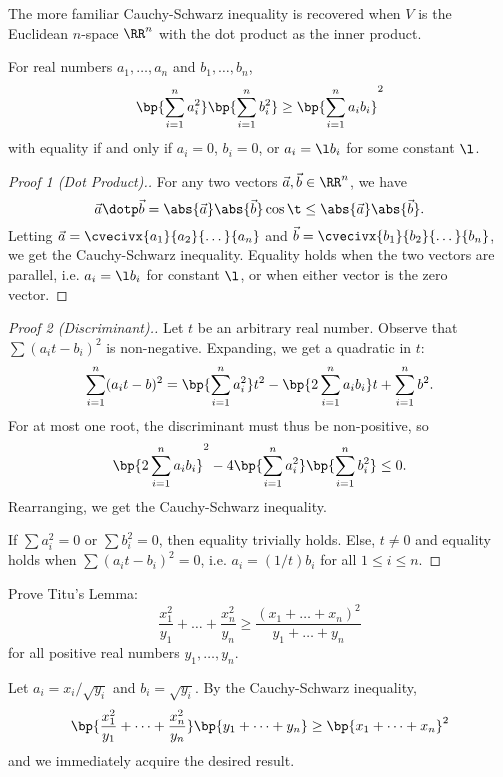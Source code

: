 The more familiar Cauchy-Schwarz inequality is recovered when $V$ is the Euclidean $n$-space $\RR^n$ with the dot product as the inner product.

\begin{proposition}
    For real numbers $a_1, \dots, a_n$ and $b_1, \dots, b_n$, \[\bp{\sum_{i = 1}^n a_i^2} \bp{\sum_{i = 1}^n b_i^2} \geq \bp{\sum_{i =1}^n a_i b_i}^2\] with equality if and only if $a_i = 0$, $b_i = 0$, or $a_i = \l b_i$ for some constant $\l$.
\end{proposition}
\begin{proof}[Proof 1 (Dot Product).]
    For any two vectors $\vec a, \vec b \in \RR^n$, we have \[\vec a \dotp \vec b = \abs{\vec a} \abs{\vec b} \cos \t \leq \abs{\vec a} \abs{\vec b}.\] Letting $\vec a = \cvecivx{a_1}{a_2}{\dots}{a_n}$ and $\vec b = \cvecivx{b_1}{b_2}{\dots}{b_n}$, we get the Cauchy-Schwarz inequality. Equality holds when the two vectors are parallel, i.e. $a_i = \l b_i$ for constant $\l$, or when either vector is the zero vector.
\end{proof}
\begin{proof}[Proof 2 (Discriminant).]
    Let $t$ be an arbitrary real number. Observe that $\sum (a_i t - b_i)^2$ is non-negative. Expanding, we get a quadratic in $t$: \[\sum_{i = 1}^n (a_i t - b)^2 = \bp{\sum_{i = 1}^n a_i^2} t^2 - \bp{2\sum_{i = 1}^n a_i b_i} t + \sum_{i = 1}^n b^2.\] For at most one root, the discriminant must thus be non-positive, so \[\bp{2\sum_{i = 1}^n a_i b_i}^2 - 4\bp{\sum_{i = 1}^n a_i^2}\bp{\sum_{i = 1}^n b_i^2} \leq 0.\] Rearranging, we get the Cauchy-Schwarz inequality.
    
    If $\sum a_i^2 = 0$ or $\sum b_i^2 = 0$, then equality trivially holds. Else, $t \neq 0$ and equality holds when $\sum (a_i t - b_i)^2 = 0$, i.e. $a_i = (1/t) b_i$ for all $1 \leq i \leq n$.
\end{proof}

\begin{sample}
    Prove Titu's Lemma: \[\frac{x_1^2}{y_1} + \dots + \frac{x_n^2}{y_n} \geq \frac{(x_1 + \dots + x_n)^2}{y_1 + \dots + y_n}\] for all positive real numbers $y_1, \dots, y_n$.
\end{sample}
\begin{sampans}
    Let $a_i = x_i/\sqrt{y_i}$ and $b_i = \sqrt{y_i}$. By the Cauchy-Schwarz inequality, \[\bp{\frac{x_1^2}{y_1} + \dots + \frac{x_n^2}{y_n}}\bp{y_1 + \dots + y_n} \geq \bp{x_1 + \dots + x_n}^2\] and we immediately acquire the desired result.
\end{sampans}

